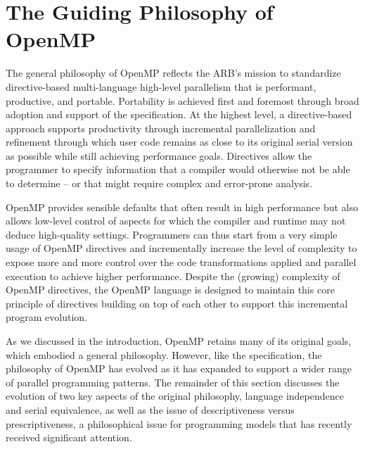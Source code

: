 \section{The Guiding Philosophy of OpenMP}
\label{sec:philosophy}

The general philosophy of OpenMP reflects the ARB's mission to standardize 
directive-based multi-language high-level parallelism that is performant, 
productive, and portable. Portability is achieved first and foremost through
broad adoption and support of the specification. At the highest level, a 
directive-based approach supports productivity through incremental 
parallelization and refinement through which user code remains as close 
to its original serial version as possible while still achieving performance 
goals. Directives allow the programmer to specify information that a compiler
would otherwise not be able to determine -- or that might require complex
and error-prone analysis. 

OpenMP provides sensible defaults that often result in high
performance but also allows low-level control of aspects for which the compiler
and runtime may not deduce high-quality settings. Programmers can thus start
from a very simple usage of OpenMP directives and incrementally increase the
level of complexity to expose more and more control over the code
transformations applied and parallel execution to achieve higher performance.
Despite the (growing) complexity of OpenMP directives, the OpenMP language is
designed to maintain this core principle of directives building on top of each
other to support this incremental program evolution.

As we discussed in the introduction, OpenMP retains many of its original
goals, which embodied a general philosophy. However, like the specification, 
the philosophy of OpenMP has evolved as it has expanded to support a wider
range of parallel programming patterns. The remainder of this section 
discusses the evolution of two key aspects of the original philosophy,
language independence and serial equivalence, as well as the issue of
descriptiveness versus prescriptiveness, a philosophical issue for 
programming models that has recently received significant attention.





